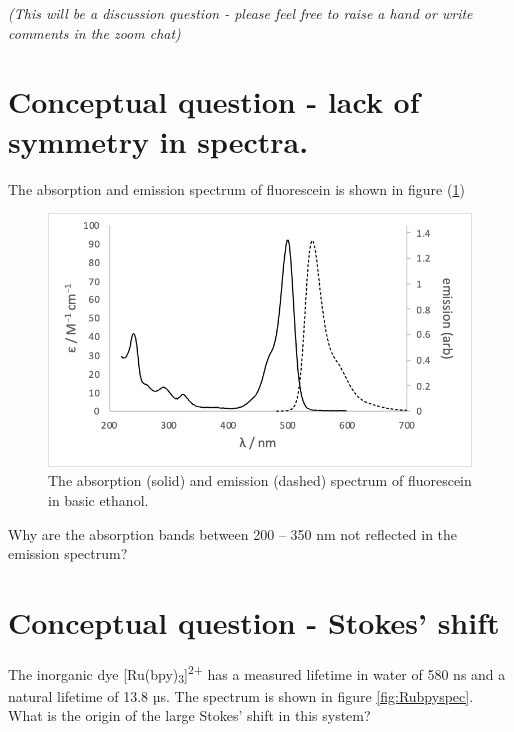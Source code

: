 \documentclass[
]{book}
\begin{document}
\emph{(This will be a discussion question - please feel free to raise a hand or write comments in the zoom chat)}

\hypertarget{conceptual-question---lack-of-symmetry-in-spectra.}{%
\section{Conceptual question - lack of symmetry in spectra.}\label{conceptual-question---lack-of-symmetry-in-spectra.}}

The absorption and emission spectrum of fluorescein is shown in figure (\ref{fig:fluoresceinspec})

\begin{figure}

{\centering \includegraphics[width=0.7\linewidth]{images/fluoresceinspec} 

}

\caption{The absorption (solid) and emission (dashed) spectrum of fluorescein in basic ethanol.}\label{fig:fluoresceinspec}
\end{figure}

Why are the absorption bands between 200 -- 350 nm not reflected in the emission spectrum?

\hypertarget{sec:stokes}{%
\section{Conceptual question - Stokes' shift}\label{sec:stokes}}

The inorganic dye {[}Ru(bpy)\textsubscript{3}{]}\textsuperscript{2+} has a measured lifetime in water of 580 ns and a natural lifetime of 13.8 µs. The spectrum is shown in figure \ref{fig:Rubpyspec}. What is the origin of the large Stokes' shift in this system?
\end{document}
